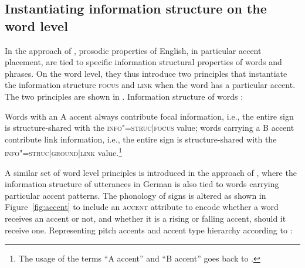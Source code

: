 \documentclass[output=paper
	        ,collection
	        ,collectionchapter
 	        ,biblatex
                ,babelshorthands
                ,newtxmath
                ,draftmode
                ,colorlinks, citecolor=brown
]{langscibook}
\begin{document}
\subsection{Instantiating information structure on the word level}
\label{sec:instant}

In the approach of \cite{EV96a}, prosodic properties of
English, in particular accent placement, are tied to specific information
structural properties of words and phrases. On the word level, they
thus introduce two principles that instantiate the information
structure \textsc{focus} and \textsc{link} when the word has a
particular accent. The two principles are shown in
.
\ea
Information structure of words \citep[56]{EV96a}:\\

  \label{fig:engdahl-word-principle}
\z
Words with an A accent always contribute focal information, i.e., the
entire sign is structure-shared with the \textsc{info"=struc|focus}
value; words carrying a B accent contribute link information, i.e., the
entire sign is structure-shared with the
\textsc{info"=struc|ground|link} value.\footnote{The usage of the terms ``A accent'' and ``B accent'' goes back to \cite{Jackendoff72a-u}.}

A similar set of word level principles is introduced in the approach
of \citet{deKuthy2002a}, where the information structure of utterances
in German is also tied to words carrying particular accent patterns.
The phonology of signs is altered as shown in Figure~\ref{fig:accent}
to include an \textsc{accent} attribute to encode whether a word
receives an accent or not, and whether it is a rising or falling
accent, should it receive one.
\ea
Representing pitch accents and accent type hierarchy according to \citet[166]{deKuthy2002a}:\\

\unskip
    \label{fig:accent}
\z
\end{document}
